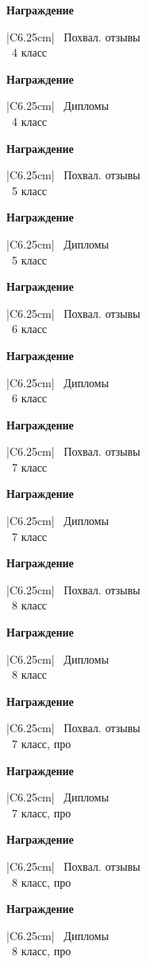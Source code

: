 \def\nagrpage#1#2{
\newpage
\begin{center}
	{\bf\large Награждение} \\ \vspace{1.1cm}
	\Large %
	\begin{tabular}{|C{6.25cm}|}
	\hline
		\, #1
		\vphantom{$\int\limits_0^0$} \\
	\hline
		\, #2 класс
		\vphantom{$\int\limits_0^0$} \\
	\hline
	\end{tabular}
\end{center}
}

\def\nagrpagepro#1#2{
\newpage
\begin{center}
	{\bf\large Награждение} \\ \vspace{1.1cm}
	\Large %
	\begin{tabular}{|C{6.25cm}|}
	\hline
		\, #1
		\vphantom{$\int\limits_0^0$} \\
	\hline
		\, #2 класс, про
		\vphantom{$\int\limits_0^0$} \\
	\hline
	\end{tabular}
\end{center}
}

\nagrpage{Похвал. отзывы}{4}
\nagrpage{Дипломы}{4}
\nagrpage{Похвал. отзывы}{5}
\nagrpage{Дипломы}{5}
\nagrpage{Похвал. отзывы}{6}
\nagrpage{Дипломы}{6}
\nagrpage{Похвал. отзывы}{7}
\nagrpage{Дипломы}{7}
\nagrpage{Похвал. отзывы}{8}
\nagrpage{Дипломы}{8}
\nagrpagepro{Похвал. отзывы}{7}
\nagrpagepro{Дипломы}{7}
\nagrpagepro{Похвал. отзывы}{8}
\nagrpagepro{Дипломы}{8}